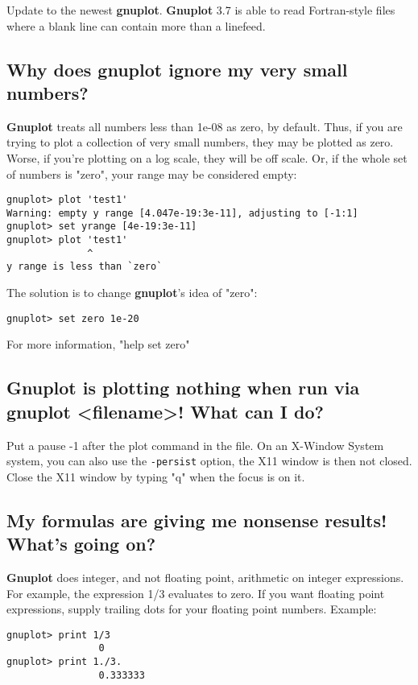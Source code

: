 \documentclass[a4paper,11pt]{article}
\newcommand{\gnuplot}{\textbf{gnuplot}}
\newcommand{\Gnuplot}{\textbf{Gnuplot}}
\begin{document}
Update to the newest \gnuplot.
\Gnuplot{} 3.7 is able to read Fortran-style
files where a blank line can contain more than a linefeed.


\subsection{Why does \gnuplot{} ignore my very small numbers?}


\Gnuplot{} treats all numbers less than 1e-08 as zero, by default.
Thus, if you are trying to plot a collection of very small
numbers, they may be plotted as zero. Worse, if you're plotting
on a log scale, they will be off scale. Or, if the whole set of
numbers is "zero", your range may be considered empty:


\begin{verbatim}
gnuplot> plot 'test1'
Warning: empty y range [4.047e-19:3e-11], adjusting to [-1:1]
gnuplot> set yrange [4e-19:3e-11]
gnuplot> plot 'test1'
              ^
y range is less than `zero`
\end{verbatim}

The solution is to change \gnuplot's idea of "zero":
\begin{verbatim}
gnuplot> set zero 1e-20
\end{verbatim}

For more information, "help set zero"

\subsection{\Gnuplot{} is plotting nothing when run via \gnuplot{}
	<filename>!  What can I do?}

Put a pause -1 after the plot command in the file. On an X-Window System
system, you can also use the \verb+-persist+ option, the X11 window is
then not closed. Close the X11 window by typing "q" when the focus is on
it.


\subsection{My formulas are giving me nonsense results! What's going on?}

\Gnuplot{} does integer, and not floating point, arithmetic on
integer expressions. For example, the expression 1/3 evaluates
to zero. If you want floating point expressions, supply
trailing dots for your floating point numbers. Example:


\begin{verbatim}
gnuplot> print 1/3
                0
gnuplot> print 1./3.
                0.333333
\end{verbatim}
\end{document}
